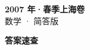 \documentclass[zihao=-4, a4paper]{ctexart}
\begin{document}
\begin{center}
  {\Large\bfseries 2007 年·春季上海卷}\\[4pt]
  {\large 数学 · 简答版}
\end{center}
\medskip
{}

\clearpage
{}
\begin{center}{\Large\bfseries 答案速查}\end{center}
\medskip

\end{document}
